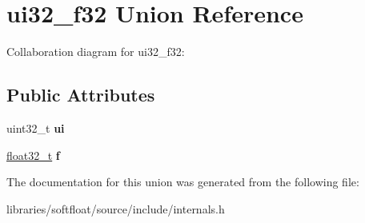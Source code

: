 \hypertarget{unionui32__f32}{}\section{ui32\+\_\+f32 Union Reference}
\label{unionui32__f32}


Collaboration diagram for ui32\+\_\+f32\+:
\subsection*{Public Attributes}
\begin{DoxyCompactItemize}
\item 
\mbox{\label{unionui32__f32_a5cb9efb220bdfbf15f278762f0a5a152}} 
uint32\+\_\+t {\bfseries ui}
\item 
\mbox{\label{unionui32__f32_a8623a30ee66833362a71aafeb4ad94d0}} 
\mbox{\hyperlink{structfloat32__t}{float32\+\_\+t}} {\bfseries f}
\end{DoxyCompactItemize}


The documentation for this union was generated from the following file\+:\begin{DoxyCompactItemize}
\item 
libraries/softfloat/source/include/internals.\+h\end{DoxyCompactItemize}
